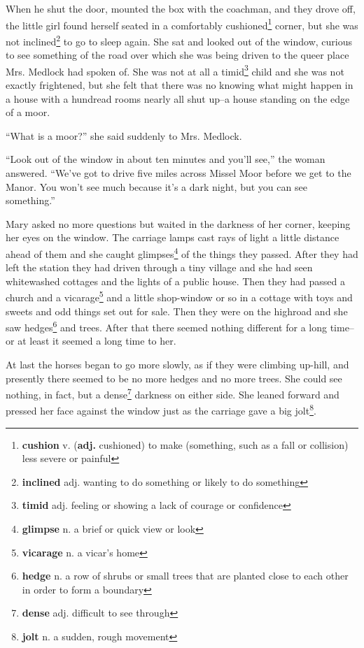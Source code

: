 When he shut the door, mounted the box with the coachman, and they drove off, the little girl found herself seated in a comfortably cushioned\footnote{\textbf{cushion} v. (\textbf{adj.} cushioned) to make (something, such as a fall or collision) less severe or painful} corner, but she was not inclined\footnote{\textbf{inclined} adj. wanting to do something or likely to do something} to go to sleep again. She sat and looked out of the window, curious to see something of the road over which she was being driven to the queer place Mrs. Medlock had spoken of. She was not at all a timid\footnote{\textbf{timid} adj. feeling or showing a lack of courage or confidence} child and she was not exactly frightened, but she felt that there was no knowing what might happen in a house with a hundread rooms nearly all shut up--a house standing on the edge of a moor.

``What is a moor?'' she said suddenly to Mrs. Medlock.

``Look out of the window in about ten minutes and you'll see,'' the woman answered. ``We've got to drive five miles across Missel Moor before we get to the Manor. You won't see much because it's a dark night, but you can see something.''

Mary asked no more questions but waited in the darkness of her corner, keeping her eyes on the window. The carriage lamps cast rays of light a little distance ahead of them and she caught glimpses\footnote{\textbf{glimpse} n. a brief or quick view or look} of the things they passed. After they had left the station they had driven through a tiny village and she had seen whitewashed cottages and the lights of a public house. Then they had passed a church and a vicarage\footnote{\textbf{vicarage} n. a vicar's home} and a little shop-window or so in a cottage with toys and sweets and odd things set out for sale. Then they were on the highroad and she saw hedges\footnote{\textbf{hedge} n. a row of shrubs or small trees that are planted close to each other in order to form a boundary} and trees. After that there seemed nothing different for a long time--or at least it seemed a long time to her.

At last the horses began to go more slowly, as if they were climbing up-hill, and presently there seemed to be no more hedges and no more trees. She could see nothing, in fact, but a dense\footnote{\textbf{dense} adj. difficult to see through} darkness on either side. She leaned forward and pressed her face against the window just as the carriage gave a big jolt\footnote{\textbf{jolt} n. a sudden, rough movement}.

